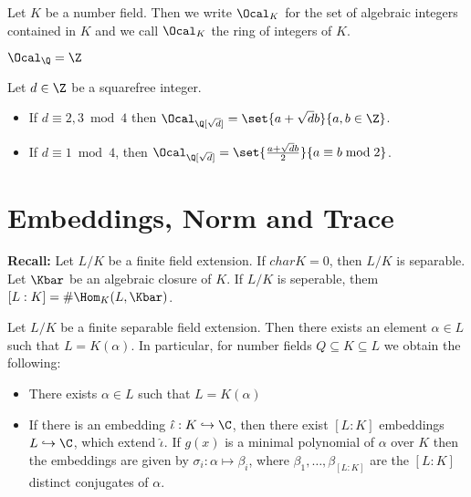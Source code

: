 
\begin{defn*}
	Let \( K \) be a number field.
	Then we write \( \Ocal_K \) for the set of algebraic integers contained in \( K \) and we call \( \Ocal_K \) the ring of integers of \( K \).
\end{defn*}

\begin{exmp*}
	\( \Ocal_\Q = \Z \)
\end{exmp*}

\begin{prop}
	Let \( d \in \Z \) be a squarefree integer.
	\begin{itemize}
		\item If \( d \equiv 2,3 \bmod 4 \) then \( \Ocal_{\Q[\sqrt{d}]} = \set{a + \sqrt{d}b}{a,b \in \Z} \).
		\item If \( d \equiv 1 \bmod 4 \), then \( \Ocal_{\Q[\sqrt{d}]} = \set{\frac{a+\sqrt{d}b}{2}}{a \equiv b \bmod 2} \).
	\end{itemize}
\end{prop}


\section{Embeddings, Norm and Trace}

\textbf{Recall:} Let \( L/K \) be a finite field extension.
If \( char K = 0 \), then \( L/K \) is separable.
Let \( \Kbar \) be an algebraic closure of \( K \). If \( L/K \) is seperable, them \( [L:K] = \#\Hom_K (L, \Kbar) \).

\begin{thm*}
	Let \( L/K \) be a finite separable field extension.
	Then there exists an element \( \alpha \in L \) such that \( L = K(\alpha) \).
	In particular, for number fields \( Q \subseteq K \subseteq L \) we obtain the following:
	\begin{itemize}
		\item There exists \( \alpha \in L \) such that \( L = K(\alpha) \)
		\item If there is an embedding \( \hat{\iota}: K \hookrightarrow \C \), then there exist \( [L:K] \) embeddings \( L \hookrightarrow \C \), which extend \( \hat{\iota} \). If \( g(x) \) is a minimal polynomial of \( \alpha \) over \( K \) then the embeddings are given by \( \sigma_i: \alpha \mapsto \beta_i \), where \( \beta_1, \dotsc, \beta_{[L:K]} \) are the \( [L:K] \) distinct conjugates of \( \alpha \).
	\end{itemize}
\end{thm*}

